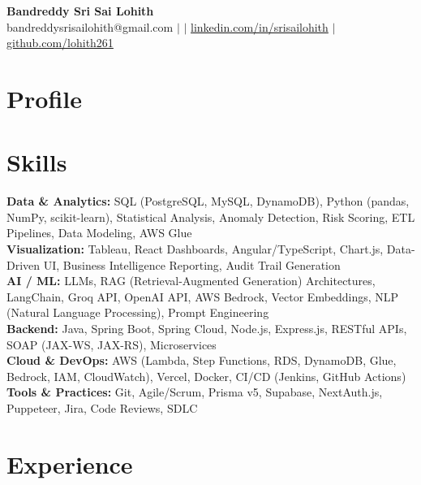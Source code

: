 \documentclass[10pt,letterpaper]{article}
\newcommand{\skillrow}[2]{\textbf{#1:} #2 \\[1pt]}
\begin{document}
\begin{center}
  {\Huge\bfseries Bandreddy Sri Sai Lohith}\\[3pt]
  \small bandreddysrisailohith@gmail.com $\vert$ $\vert$\; \href{https://linkedin.com/in/srisailohith}{linkedin.com/in/srisailohith} $\vert$\; \href{https://github.com/lohith261}{github.com/lohith261}
\end{center}

\section{Profile}


\section{Skills}

\skillrow{Data \& Analytics}{SQL (PostgreSQL, MySQL, DynamoDB), Python (pandas, NumPy, scikit-learn), Statistical Analysis, Anomaly Detection, Risk Scoring, ETL Pipelines, Data Modeling, AWS Glue}
\skillrow{Visualization}{Tableau, React Dashboards, Angular/TypeScript, Chart.js, Data-Driven UI, Business Intelligence Reporting, Audit Trail Generation}
\skillrow{AI / ML}{LLMs, RAG (Retrieval-Augmented Generation) Architectures, LangChain, Groq API, OpenAI API, AWS Bedrock, Vector Embeddings, NLP (Natural Language Processing), Prompt Engineering}
\skillrow{Backend}{Java, Spring Boot, Spring Cloud, Node.js, Express.js, RESTful APIs, SOAP (JAX-WS, JAX-RS), Microservices}
\skillrow{Cloud \& DevOps}{AWS (Lambda, Step Functions, RDS, DynamoDB, Glue, Bedrock, IAM, CloudWatch), Vercel, Docker, CI/CD (Jenkins, GitHub Actions)}
\skillrow{Tools \& Practices}{Git, Agile/Scrum, Prisma v5, Supabase, NextAuth.js, Puppeteer, Jira, Code Reviews, SDLC}

\section{Experience}
\end{document}
